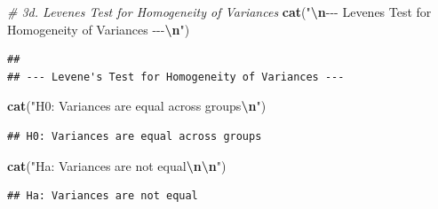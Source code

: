 \documentclass[
  12pt,
]{article}
\newenvironment{Shaded}{\begin{snugshade}}{\end{snugshade}}
\newcommand{\AttributeTok}[1]{\textcolor[rgb]{0.13,0.29,0.53}{#1}}
\newcommand{\CommentTok}[1]{\textcolor[rgb]{0.56,0.35,0.01}{\textit{#1}}}
\newcommand{\DecValTok}[1]{\textcolor[rgb]{0.00,0.00,0.81}{#1}}
\newcommand{\FunctionTok}[1]{\textcolor[rgb]{0.13,0.29,0.53}{\textbf{#1}}}
\newcommand{\NormalTok}[1]{#1}
\newcommand{\OtherTok}[1]{\textcolor[rgb]{0.56,0.35,0.01}{#1}}
\newcommand{\SpecialCharTok}[1]{\textcolor[rgb]{0.81,0.36,0.00}{\textbf{#1}}}
\newcommand{\StringTok}[1]{\textcolor[rgb]{0.31,0.60,0.02}{#1}}
\begin{document}
\begin{Shaded}
\begin{Highlighting}[]
\CommentTok{\# 3d. Levene\textquotesingle{}s Test for Homogeneity of Variances}
\FunctionTok{cat}\NormalTok{(}\StringTok{"}\SpecialCharTok{\textbackslash{}n}\StringTok{{-}{-}{-} Levene\textquotesingle{}s Test for Homogeneity of Variances {-}{-}{-}}\SpecialCharTok{\textbackslash{}n}\StringTok{"}\NormalTok{)}
\end{Highlighting}
\end{Shaded}

\begin{verbatim}
## 
## --- Levene's Test for Homogeneity of Variances ---
\end{verbatim}

\begin{Shaded}
\begin{Highlighting}[]
\FunctionTok{cat}\NormalTok{(}\StringTok{"H0: Variances are equal across groups}\SpecialCharTok{\textbackslash{}n}\StringTok{"}\NormalTok{)}
\end{Highlighting}
\end{Shaded}

\begin{verbatim}
## H0: Variances are equal across groups
\end{verbatim}

\begin{Shaded}
\begin{Highlighting}[]
\FunctionTok{cat}\NormalTok{(}\StringTok{"Ha: Variances are not equal}\SpecialCharTok{\textbackslash{}n\textbackslash{}n}\StringTok{"}\NormalTok{)}
\end{Highlighting}
\end{Shaded}

\begin{verbatim}
## Ha: Variances are not equal
\end{verbatim}

\begin{Shaded}
\end{Shaded}
\end{document}
